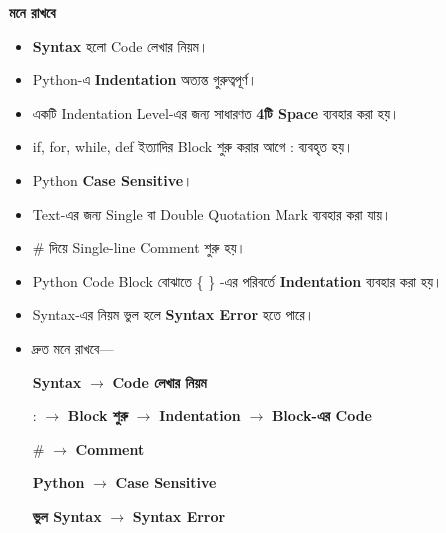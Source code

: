 \begin{rememberbox}

\textbf{\color{deepOrange}মনে রাখবে}

\begin{itemize}

\item
\textbf{Syntax}
হলো Code লেখার নিয়ম।

\item
Python-এ
\textbf{Indentation}
অত্যন্ত গুরুত্বপূর্ণ।

\item
একটি Indentation Level-এর জন্য সাধারণত
\textbf{4টি Space}
ব্যবহার করা হয়।

\item
\textenglish{\ttfamily if},
\textenglish{\ttfamily for},
\textenglish{\ttfamily while},
\textenglish{\ttfamily def}
ইত্যাদির Block শুরু করার আগে
\textenglish{\ttfamily :}
ব্যবহৃত হয়।

\item
Python
\textbf{Case Sensitive}।

\item
Text-এর জন্য Single বা Double Quotation Mark ব্যবহার করা যায়।

\item
\textenglish{\ttfamily \#}
দিয়ে Single-line Comment শুরু হয়।

\item
Python Code Block বোঝাতে
\textenglish{\ttfamily \{ \}}
-এর পরিবর্তে
\textbf{Indentation}
ব্যবহার করা হয়।

\item
Syntax-এর নিয়ম ভুল হলে
\textbf{Syntax Error}
হতে পারে।

\item
দ্রুত মনে রাখবে—

\begin{center}

\textbf{Syntax}
\(\longrightarrow\)
\textbf{Code লেখার নিয়ম}

\medskip

\textenglish{\ttfamily :}
\(\longrightarrow\)
\textbf{Block শুরু}
\(\longrightarrow\)
\textbf{Indentation}
\(\longrightarrow\)
\textbf{Block-এর Code}

\medskip

\textenglish{\ttfamily \#}
\(\longrightarrow\)
\textbf{Comment}

\qquad

\textbf{Python}
\(\longrightarrow\)
\textbf{Case Sensitive}

\medskip

\textbf{ভুল Syntax}
\(\longrightarrow\)
\textbf{Syntax Error}

\end{center}

\end{itemize}

\end{rememberbox}

\small


